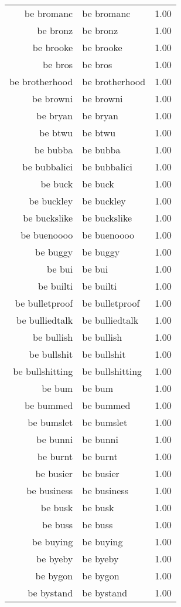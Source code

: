 \begin{table}[ht]
\begin{tabular}{rlr}
  be bromanc & be bromanc & 1.00 \\ 
  be bronz & be bronz & 1.00 \\ 
  be brooke & be brooke & 1.00 \\ 
  be bros & be bros & 1.00 \\ 
  be brotherhood & be brotherhood & 1.00 \\ 
  be browni & be browni & 1.00 \\ 
  be bryan & be bryan & 1.00 \\ 
  be btwu & be btwu & 1.00 \\ 
  be bubba & be bubba & 1.00 \\ 
  be bubbalici & be bubbalici & 1.00 \\ 
  be buck & be buck & 1.00 \\ 
  be buckley & be buckley & 1.00 \\ 
  be buckslike & be buckslike & 1.00 \\ 
  be buenoooo & be buenoooo & 1.00 \\ 
  be buggy & be buggy & 1.00 \\ 
  be bui & be bui & 1.00 \\ 
  be builti & be builti & 1.00 \\ 
  be bulletproof & be bulletproof & 1.00 \\ 
  be bulliedtalk & be bulliedtalk & 1.00 \\ 
  be bullish & be bullish & 1.00 \\ 
  be bullshit & be bullshit & 1.00 \\ 
  be bullshitting & be bullshitting & 1.00 \\ 
  be bum & be bum & 1.00 \\ 
  be bummed & be bummed & 1.00 \\ 
  be bumslet & be bumslet & 1.00 \\ 
  be bunni & be bunni & 1.00 \\ 
  be burnt & be burnt & 1.00 \\ 
  be busier & be busier & 1.00 \\ 
  be business & be business & 1.00 \\ 
  be busk & be busk & 1.00 \\ 
  be buss & be buss & 1.00 \\ 
  be buying & be buying & 1.00 \\ 
  be byeby & be byeby & 1.00 \\ 
  be bygon & be bygon & 1.00 \\ 
  be bystand & be bystand & 1.00 \\ 

\end{tabular}
\end{table}

